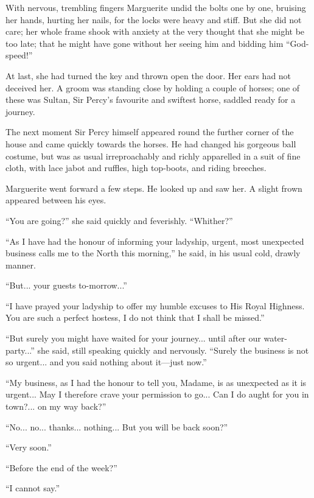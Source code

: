 With nervous, trembling fingers Marguerite undid the bolts one by one, bruising her hands, hurting her nails, for the locks were heavy and stiff. But she did not care; her whole frame shook with anxiety at the very thought that she might be too late; that he might have gone without her seeing him and bidding him \enquote{God-speed!}

At last, she had turned the key and thrown open the door. Her ears had not deceived her. A groom was standing close by holding a couple of horses; one of these was Sultan, Sir Percy's favourite and swiftest horse, saddled ready for a journey.

The next moment Sir Percy himself appeared round the further corner of the house and came quickly towards the horses. He had changed his gorgeous ball costume, but was as usual irreproachably and richly apparelled in a suit of fine cloth, with lace jabot and ruffles, high top-boots, and riding breeches.

Marguerite went forward a few steps. He looked up and saw her. A slight frown appeared between his eyes.

\enquote{You are going?} she said quickly and feverishly. \enquote{Whither?}

\enquote{As I have had the honour of informing your ladyship, urgent, most unexpected business calls me to the North this morning,} he said, in his usual cold, drawly manner.

\enquote{But... your guests to-morrow...}

\enquote{I have prayed your ladyship to offer my humble excuses to His Royal Highness. You are such a perfect hostess, I do not think that I shall be missed.}

\enquote{But surely you might have waited for your journey... until after our water-party...} she said, still speaking quickly and nervously. \enquote{Surely the business is not so urgent... and you said nothing about it---just now.}

\enquote{My business, as I had the honour to tell you, Madame, is as unexpected as it is urgent... May I therefore crave your permission to go... Can I do aught for you in town?... on my way back?}

\enquote{No... no... thanks... nothing... But you will be back soon?}

\enquote{Very soon.}

\enquote{Before the end of the week?}

\enquote{I cannot say.}

